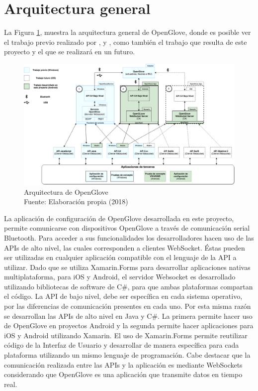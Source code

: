 \section{Arquitectura general}

La Figura \ref{fig:arquitectura-open-glove}, muestra la arquitectura general de OpenGlove, donde es posible ver el trabajo previo realizado por \cite{tesis-monsalve-rodrigo}, \cite{tesis-meneses-sebastian} y \cite{tesis-cerda-rodrigo}, como también el trabajo que resulta de este proyecto y el que se realizará en un futuro.

\begin{figure}[H]
  \begin{center} 
   	\includegraphics[width=1.0\textwidth]{images/chapter04/OpenGlove-Architecture-General.png} 
    \caption[Arquitectura de Openglove]{Arquitectura de OpenGlove \\Fuente: Elaboración propia (2018)}
    \label{fig:arquitectura-open-glove}
  \end{center}
\end{figure}

La aplicación de configuración de OpenGlove desarrollada en este proyecto, permite comunicarse con dispositivos OpenGlove a través de comunicación serial Bluetooth. Para acceder a sus funcionalidades los desarrolladores hacen uso de las APIs de alto nivel, las cuales corresponden a clientes WebSocket. Éstas pueden ser utilizadas en cualquier aplicación compatible con el lenguaje de la API a utilizar. Dado que se utiliza Xamarin.Forms para desarrollar aplicaciones nativas multiplataforma, para iOS y Android, el servidor Websocket es desarrollado utilizando bibliotecas de software de C\#, para que ambas plataformas compartan el código. La API de bajo nivel, debe ser específica en cada sistema operativo, por las diferencias de comunicación presentes en cada uno. Por esta misma razón se desarrollan las APIs de alto nivel en  Java y C\#. La primera permite hacer uso de OpenGlove en proyectos Android y la segunda permite hacer aplicaciones para iOS y Android utilizando Xamarin. El uso de Xamarin.Forms permite reutilizar código de la Interfaz de Usuario y desarrollar de manera específica para cada plataforma utilizando un mismo lenguaje de programación. Cabe destacar que la comunicación realizada entre las APIs y la aplicación es mediante WebSockets considerando que OpenGlove es una aplicación que transmite datos en tiempo real.

